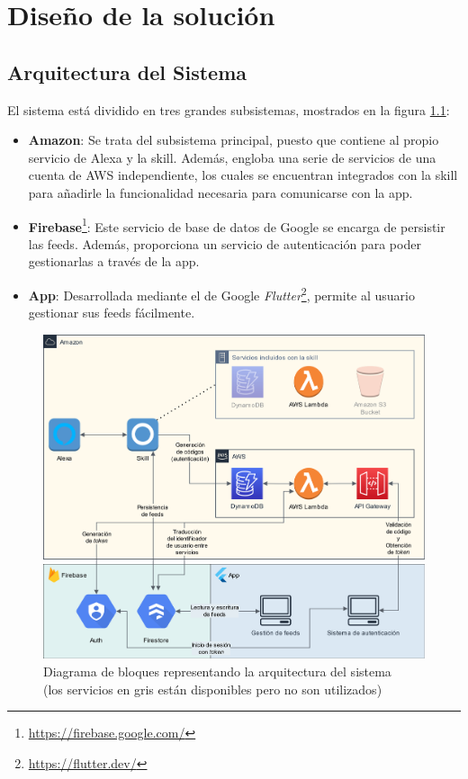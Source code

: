 \documentclass[11pt,spanish,listoffigures,listoftables,table,hyphens,dvipsnames]{tfgetsinf}
\newcommand{\fe}[1]{\foreign{english}{#1}}
\begin{document}

\chapter{Diseño de la solución}
\label{capitulo:diseno-solucion}

\section{Arquitectura del Sistema}

El sistema está dividido en tres grandes subsistemas, mostrados en la figura \ref{figura:diagrama-bloques}:

\begin{itemize}
   \item \textbf{Amazon}: Se trata del subsistema principal, puesto que contiene al propio servicio de Alexa y la skill. Además, engloba una serie de servicios de una cuenta de AWS independiente, los cuales se encuentran integrados con la skill para añadirle la funcionalidad necesaria para comunicarse con la app.
   \item \textbf{Firebase}\footnote{\url{https://firebase.google.com/}}: Este servicio de base de datos de Google se encarga de persistir las feeds. Además, proporciona un servicio de autenticación para poder gestionarlas a través de la app. 
   \item \textbf{App}: Desarrollada mediante el \fe{framework} de Google \emph{Flutter}\footnote{\url{https://flutter.dev/}}, permite al usuario gestionar sus feeds fácilmente. 
\end{itemize}

\begin{figure}[ht]
   \centering
   \includegraphics[width=\textwidth]{diagrama-bloques.png}
      \caption[Diagrama de bloques]{Diagrama de bloques representando la arquitectura del sistema\\
      \footnotesize (los servicios en gris están disponibles pero no son utilizados)}
   \label{figura:diagrama-bloques}
\end{figure}
\end{document}
